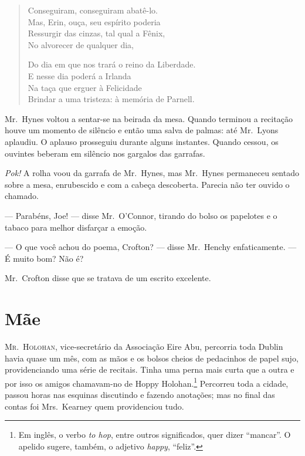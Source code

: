 \begin{verse}
Conseguiram, conseguiram abatê-lo.\\
Mas, Erin, ouça, seu espírito poderia\\
Ressurgir das cinzas, tal qual a Fênix,\\
No alvorecer de qualquer dia,

Do dia em que nos trará o reino da Liberdade.\\
E nesse dia poderá a Irlanda\\
Na taça que erguer à Felicidade\\
Brindar a uma tristeza: à memória de Parnell.
\end{verse}

Mr.~Hynes voltou a sentar-se na beirada da mesa.  Quando terminou a recitação
houve um momento de silêncio e então uma salva de palmas: até Mr.~Lyons
aplaudiu.  O aplauso prosseguiu durante alguns instantes.  Quando cessou, os
ouvintes beberam em silêncio nos gargalos das garrafas.

\textit{Pok!} A rolha voou da garrafa de Mr.~Hynes, mas Mr.~Hynes permaneceu
sentado sobre a mesa, enrubescido e com a cabeça descoberta.  Parecia não ter
ouvido o chamado.

--- Parabéns, Joe! --- disse Mr.~O’Connor, tirando do bolso os papelotes e o
tabaco para melhor disfarçar a emoção.

--- O que você achou do poema, Crofton? --- disse Mr.~Henchy enfaticamente.
--- É muito bom?  Não é?

Mr.~Crofton disse que se tratava de um escrito excelente.


\chapter{Mãe}

\textsc{Mr.~Holohan,} vice-secretário da Associação Eire Abu, percorria toda
Dublin havia quase um mês, com as mãos e os bolsos cheios de pedacinhos de
papel sujo, providenciando uma série de recitais.  Tinha uma perna mais curta
que a outra e por isso os amigos chamavam-no de Hoppy Holohan.\footnote{ Em
inglês, o verbo \textit{to hop}, entre outros significados, quer dizer ``mancar''.
O apelido sugere, também, o adjetivo \textit{happy}, “feliz”.}
Percorreu toda a cidade, passou horas nas esquinas discutindo e fazendo
anotações; mas no final das contas foi Mrs.~Kearney quem providenciou tudo.

